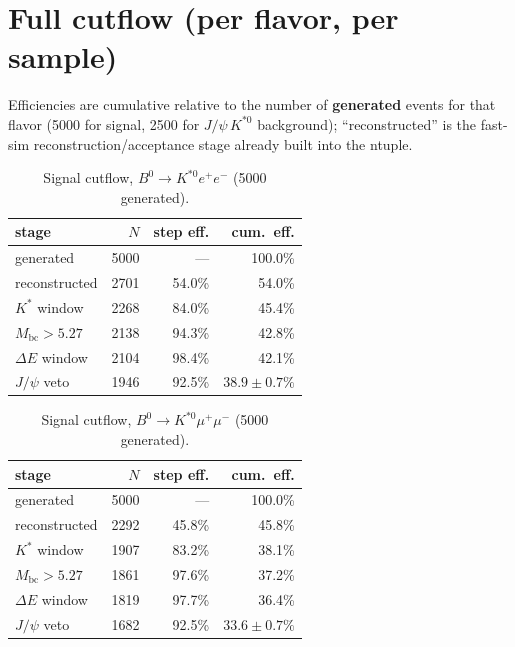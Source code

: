 \documentclass[11pt]{article}
\newcommand{\Kst}{K^{*0}}
\newcommand{\Mbc}{M_{\mathrm{bc}}}
\newcommand{\dE}{\Delta E}
\newcommand{\jpsi}{J/\psi}
\begin{document}
\section{Full cutflow (per flavor, per sample)}
\label{sec:cutflow}

Efficiencies are cumulative relative to the number of
\textbf{generated} events for that flavor (5000 for signal, 2500 for
$\jpsi\,\Kst$ background); ``reconstructed'' is the fast-sim
reconstruction/acceptance stage already built into the ntuple.

\begin{table}[htbp]
\centering
\begin{tabular}{lrrr}
\toprule
stage & $N$ & step eff. & cum.\ eff. \\
\midrule
generated & 5000 & --- & 100.0\% \\
reconstructed & 2701 & 54.0\% & 54.0\% \\
$K^{*}$ window & 2268 & 84.0\% & 45.4\% \\
$\Mbc > 5.27$ & 2138 & 94.3\% & 42.8\% \\
$\dE$ window & 2104 & 98.4\% & 42.1\% \\
$\jpsi$ veto & 1946 & 92.5\% & $\mathbf{38.9 \pm 0.7\%}$ \\
\bottomrule
\end{tabular}
\caption{Signal cutflow, $B^0\to\Kst e^+e^-$ (5000 generated).}
\label{tab:cutflow_sig_ee}
\end{table}

\begin{table}[htbp]
\centering
\begin{tabular}{lrrr}
\toprule
stage & $N$ & step eff. & cum.\ eff. \\
\midrule
generated & 5000 & --- & 100.0\% \\
reconstructed & 2292 & 45.8\% & 45.8\% \\
$K^{*}$ window & 1907 & 83.2\% & 38.1\% \\
$\Mbc > 5.27$ & 1861 & 97.6\% & 37.2\% \\
$\dE$ window & 1819 & 97.7\% & 36.4\% \\
$\jpsi$ veto & 1682 & 92.5\% & $\mathbf{33.6 \pm 0.7\%}$ \\
\bottomrule
\end{tabular}
\caption{Signal cutflow, $B^0\to\Kst\mu^+\mu^-$ (5000 generated).}
\label{tab:cutflow_sig_mumu}
\end{table}
\end{document}
